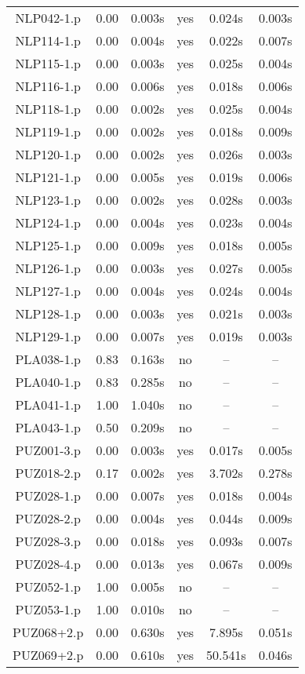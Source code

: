 \begin{center}
\begin{longtable}{||c | c | c | c | c | c||}
NLP042-1.p & 0.00 & 0.003s & yes & 0.024s & 0.003s \\
NLP114-1.p & 0.00 & 0.004s & yes & 0.022s & 0.007s \\
NLP115-1.p & 0.00 & 0.003s & yes & 0.025s & 0.004s \\
NLP116-1.p & 0.00 & 0.006s & yes & 0.018s & 0.006s \\
NLP118-1.p & 0.00 & 0.002s & yes & 0.025s & 0.004s \\
NLP119-1.p & 0.00 & 0.002s & yes & 0.018s & 0.009s \\
NLP120-1.p & 0.00 & 0.002s & yes & 0.026s & 0.003s \\
NLP121-1.p & 0.00 & 0.005s & yes & 0.019s & 0.006s \\
NLP123-1.p & 0.00 & 0.002s & yes & 0.028s & 0.003s \\
NLP124-1.p & 0.00 & 0.004s & yes & 0.023s & 0.004s \\
NLP125-1.p & 0.00 & 0.009s & yes & 0.018s & 0.005s \\
NLP126-1.p & 0.00 & 0.003s & yes & 0.027s & 0.005s \\
NLP127-1.p & 0.00 & 0.004s & yes & 0.024s & 0.004s \\
NLP128-1.p & 0.00 & 0.003s & yes & 0.021s & 0.003s \\
NLP129-1.p & 0.00 & 0.007s & yes & 0.019s & 0.003s \\
PLA038-1.p & 0.83 & 0.163s & no & -- & -- \\
PLA040-1.p & 0.83 & 0.285s & no & -- & -- \\
PLA041-1.p & 1.00 & 1.040s & no & -- & -- \\
PLA043-1.p & 0.50 & 0.209s & no & -- & -- \\
PUZ001-3.p & 0.00 & 0.003s & yes & 0.017s & 0.005s \\
PUZ018-2.p & 0.17 & 0.002s & yes & 3.702s & 0.278s \\
PUZ028-1.p & 0.00 & 0.007s & yes & 0.018s & 0.004s \\
PUZ028-2.p & 0.00 & 0.004s & yes & 0.044s & 0.009s \\
PUZ028-3.p & 0.00 & 0.018s & yes & 0.093s & 0.007s \\
PUZ028-4.p & 0.00 & 0.013s & yes & 0.067s & 0.009s \\
PUZ052-1.p & 1.00 & 0.005s & no & -- & -- \\
PUZ053-1.p & 1.00 & 0.010s & no & -- & -- \\
PUZ068+2.p & 0.00 & 0.630s & yes & 7.895s & 0.051s \\
PUZ069+2.p & 0.00 & 0.610s & yes & 50.541s & 0.046s \\

\end{longtable}
\end{center}
